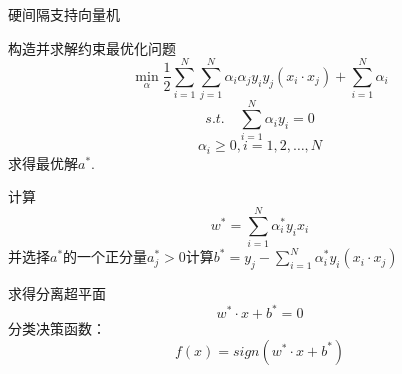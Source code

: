 \documentclass{article}
\begin{document}
	\begin{algorithm}
		\caption{硬间隔支持向量机}
		\LinesNumbered
		构造并求解约束最优化问题$$\mathop{min}_{\alpha }\frac{1}{2}\sum_{i=1}^{N}\sum_{j=1}^{N}\alpha _{i}\alpha _{j}y_{i}y_{j}\left ( x_{i}\cdot x_{j} \right ) + \sum_{i=1}^{N}\alpha _{i}$$ $$s.t. \quad \sum_{i=1}^{N}\alpha _{i}y_{i}=0$$  $$	\alpha _{i}\geq 0,i=1,2,\ldots,N$$
		求得最优解$a^{*}$.
		
		计算$$	w^{*}=\sum_{i=1}^{N}\alpha _{i}^{*}y_{i}x_{i}$$ 并选择$a^{*}$的一个正分量$a_{j}^{*}>0$计算$	b^{*}=y_{j}-\sum_{i=1}^{N}\alpha _{i}^{*}y_{i}\left ( x_{i}\cdot x_{j} \right )$
		
		求得分离超平面$$w^{*}\cdot x + b^{*}=0$$ 分类决策函数：$$f\left ( x \right ) = sign\left ( w^{*}\cdot x + b^{*} \right )$$
	\end{algorithm}
\end{document}
